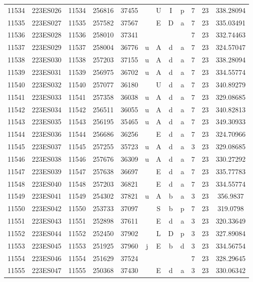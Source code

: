 \begin{tabular}{|*{12}{c|}}
11534 & 223ES026 & 11534 & 256816 & 37455 &  & U & I & p & 7 & 23 & 338.28094 \\ 
11535 & 223ES027 & 11535 & 257582 & 37567 &  & E & D & a & 7 & 23 & 335.03491 \\ 
11536 & 223ES028 & 11536 & 258010 & 37341 &  &  &  &  & 7 & 23 & 332.74463 \\ 
11537 & 223ES029 & 11537 & 258004 & 36776 & u & A & d & a & 7 & 23 & 324.57047 \\ 
11538 & 223ES030 & 11538 & 257203 & 37155 & u & A & d & a & 7 & 23 & 338.28094 \\ 
11539 & 223ES031 & 11539 & 256975 & 36702 & u & A & d & a & 7 & 23 & 334.55774 \\ 
11540 & 223ES032 & 11540 & 257077 & 36180 &  & U & d & a & 7 & 23 & 340.89279 \\ 
11541 & 223ES033 & 11541 & 257358 & 36038 & u & A & d & a & 7 & 23 & 329.08685 \\ 
11542 & 223ES034 & 11542 & 256511 & 36055 & u & A & d & a & 7 & 23 & 340.82813 \\ 
11543 & 223ES035 & 11543 & 256195 & 35465 & u & A & d & a & 7 & 23 & 349.30933 \\ 
11544 & 223ES036 & 11544 & 256686 & 36256 &  & E & d & a & 7 & 23 & 324.70966 \\ 
11545 & 223ES037 & 11545 & 257255 & 35723 & u & A & d & a & 3 & 23 & 329.08685 \\ 
11546 & 223ES038 & 11546 & 257676 & 36309 & u & A & d & a & 7 & 23 & 330.27292 \\ 
11547 & 223ES039 & 11547 & 257638 & 36697 &  & E & d & a & 7 & 23 & 335.77783 \\ 
11548 & 223ES040 & 11548 & 257203 & 36821 &  & E & d & a & 7 & 23 & 334.55774 \\ 
11549 & 223ES041 & 11549 & 254302 & 37821 & u & A & b & a & 3 & 23 & 356.9837 \\ 
11550 & 223ES042 & 11550 & 253733 & 37097 &  & S & b & p & 7 & 23 & 319.0798 \\ 
11551 & 223ES043 & 11551 & 252898 & 37611 &  & E & d & a & 3 & 23 & 320.33649 \\ 
11552 & 223ES044 & 11552 & 252450 & 37902 &  & L & D & p & 3 & 23 & 327.89084 \\ 
11553 & 223ES045 & 11553 & 251925 & 37960 & j & E & b & d & 3 & 23 & 334.56754 \\ 
11554 & 223ES046 & 11554 & 251629 & 37524 &  &  &  &  & 7 & 23 & 328.29645 \\ 
11555 & 223ES047 & 11555 & 250368 & 37430 &  & E & d & a & 3 & 23 & 330.06342 \\ 

\end{tabular}
